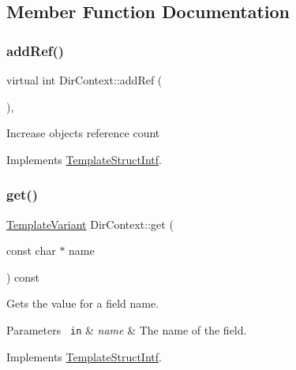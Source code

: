 \subsection{Member Function Documentation}
\mbox{\label{class_dir_context_aed347462a6216f09bf1ca609e1cc9c1a}} 
\subsubsection{\texorpdfstring{addRef()}{addRef()}}
{\footnotesize\ttfamily virtual int Dir\+Context\+::add\+Ref (\begin{DoxyParamCaption}{ }\end{DoxyParamCaption})\hspace{0.3cm}{\ttfamily [inline]}, {\ttfamily [virtual]}}

Increase object\textquotesingle{}s reference count 

Implements \mbox{\hyperlink{class_template_struct_intf_a05fe97ad47633beb326f69686faed581}{Template\+Struct\+Intf}}.

\mbox{\label{class_dir_context_a3387722406ca015b5dabe220dfbed4b6}} 
\subsubsection{\texorpdfstring{get()}{get()}}
{\footnotesize\ttfamily \mbox{\hyperlink{class_template_variant}{Template\+Variant}} Dir\+Context\+::get (\begin{DoxyParamCaption}\item[{const char $\ast$}]{name }\end{DoxyParamCaption}) const\hspace{0.3cm}{\ttfamily [virtual]}}

Gets the value for a field name. 
\begin{DoxyParams}[1]{Parameters}
\mbox{\texttt{ in}}  & {\em name} & The name of the field. \\
\hline
\end{DoxyParams}


Implements \mbox{\hyperlink{class_template_struct_intf_a3d610cb81b4adbb531ebed3aa3d09b51}{Template\+Struct\+Intf}}.

\mbox{\label{class_dir_context_aa32fa4e75b13432c9dc8d42d5e8d6cad}} 
